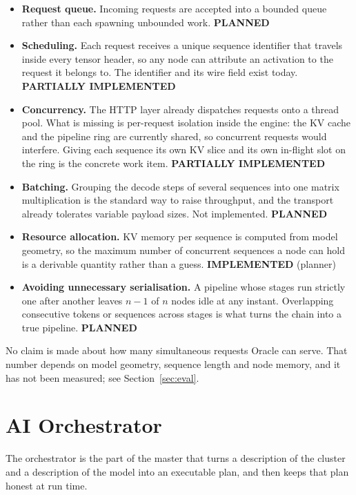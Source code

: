 \documentclass[11pt,a4paper]{article}
\newcommand{\stImp}{\textcolor{ogreen}{\footnotesize\textsf{\textbf{IMPLEMENTED}}}}
\newcommand{\stPart}{\textcolor{oamber}{\footnotesize\textsf{\textbf{PARTIALLY IMPLEMENTED}}}}
\newcommand{\stPlan}{\textcolor{oblue}{\footnotesize\textsf{\textbf{PLANNED}}}}
\begin{document}
\begin{itemize}
  \item \textbf{Request queue.} Incoming requests are accepted into a bounded
        queue rather than each spawning unbounded work. \stPlan
  \item \textbf{Scheduling.} Each request receives a unique sequence identifier
        that travels inside every tensor header, so any node can attribute an
        activation to the request it belongs to. The identifier and its wire
        field exist today. \stPart
  \item \textbf{Concurrency.} The HTTP layer already dispatches requests onto a
        thread pool. What is missing is per-request isolation inside the engine:
        the KV cache and the pipeline ring are currently shared, so concurrent
        requests would interfere. Giving each sequence its own KV slice and its
        own in-flight slot on the ring is the concrete work item. \stPart
  \item \textbf{Batching.} Grouping the decode steps of several sequences into
        one matrix multiplication is the standard way to raise throughput, and
        the transport already tolerates variable payload sizes. Not implemented.
        \stPlan
  \item \textbf{Resource allocation.} KV memory per sequence is computed from
        model geometry, so the maximum number of concurrent sequences a node can
        hold is a derivable quantity rather than a guess. \stImp{} (planner)
  \item \textbf{Avoiding unnecessary serialisation.} A pipeline whose stages run
        strictly one after another leaves $n{-}1$ of $n$ nodes idle at any
        instant. Overlapping consecutive tokens or sequences across stages is
        what turns the chain into a true pipeline. \stPlan
\end{itemize}

No claim is made about how many simultaneous requests Oracle can serve. That
number depends on model geometry, sequence length and node memory, and it has
not been measured; see Section~\ref{sec:eval}.

\section{AI Orchestrator}

The orchestrator is the part of the master that turns a description of the
cluster and a description of the model into an executable plan, and then keeps
that plan honest at run time.
\end{document}
